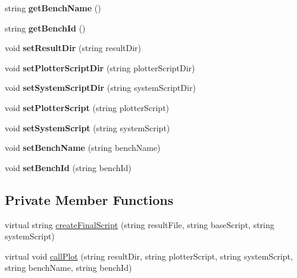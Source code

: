 \begin{DoxyCompactItemize}
\item 
\hypertarget{classAbstractPlotter_a29a690a49212aaf482147acdf8d8defb}{string {\bfseries get\-Bench\-Name} ()}\label{classAbstractPlotter_a29a690a49212aaf482147acdf8d8defb}

\item 
\hypertarget{classAbstractPlotter_a92fe6c8972c886ab9b0997a96df6d5e9}{string {\bfseries get\-Bench\-Id} ()}\label{classAbstractPlotter_a92fe6c8972c886ab9b0997a96df6d5e9}

\item 
\hypertarget{classAbstractPlotter_ac06526999e596652c6ed967ced653894}{void {\bfseries set\-Result\-Dir} (string result\-Dir)}\label{classAbstractPlotter_ac06526999e596652c6ed967ced653894}

\item 
\hypertarget{classAbstractPlotter_af93a8204593166522f9ec525e700c28e}{void {\bfseries set\-Plotter\-Script\-Dir} (string plotter\-Script\-Dir)}\label{classAbstractPlotter_af93a8204593166522f9ec525e700c28e}

\item 
\hypertarget{classAbstractPlotter_a1f85ef21decd755baed93cb738c5bdbe}{void {\bfseries set\-System\-Script\-Dir} (string system\-Script\-Dir)}\label{classAbstractPlotter_a1f85ef21decd755baed93cb738c5bdbe}

\item 
\hypertarget{classAbstractPlotter_abc8d01b2aec392d9e8242643d66fa3fa}{void {\bfseries set\-Plotter\-Script} (string plotter\-Script)}\label{classAbstractPlotter_abc8d01b2aec392d9e8242643d66fa3fa}

\item 
\hypertarget{classAbstractPlotter_afb60f39ce9e871c0dae166d5163dbdce}{void {\bfseries set\-System\-Script} (string system\-Script)}\label{classAbstractPlotter_afb60f39ce9e871c0dae166d5163dbdce}

\item 
\hypertarget{classAbstractPlotter_a7f69871c7ef9a34bd9d1a818a2071f1b}{void {\bfseries set\-Bench\-Name} (string bench\-Name)}\label{classAbstractPlotter_a7f69871c7ef9a34bd9d1a818a2071f1b}

\item 
\hypertarget{classAbstractPlotter_a170d361115a15fd44312f2e7343cc2d9}{void {\bfseries set\-Bench\-Id} (string bench\-Id)}\label{classAbstractPlotter_a170d361115a15fd44312f2e7343cc2d9}

\end{DoxyCompactItemize}
\subsection*{Private Member Functions}
\begin{DoxyCompactItemize}
\item 
virtual string \hyperlink{classAbstractPlotter_a96e48c8647cb58136903d29565072c78}{create\-Final\-Script} (string result\-File, string base\-Script, string system\-Script)
\item 
virtual void \hyperlink{classAbstractPlotter_aba080703874b001edccae14d94acbce4}{call\-Plot} (string result\-Dir, string plotter\-Script, string system\-Script, string bench\-Name, string bench\-Id)
\end{DoxyCompactItemize}
